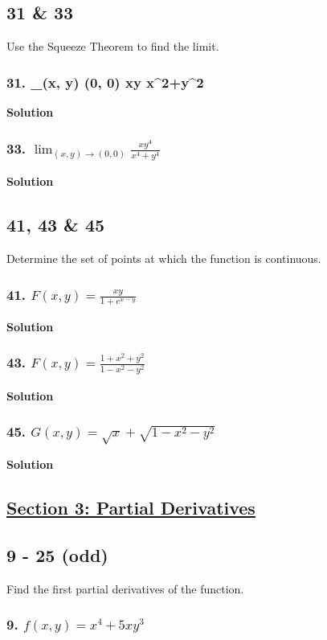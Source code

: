 \documentclass{article}
\newcommand{\limit}[4]{\lim_{(#1, #2) \to (#3, #4)}}
\begin{document}
\subsection*{31 \& 33}
Use the Squeeze Theorem to find the limit.
\subsubsection*{31. \limit x y 0 0 xy\sin \displaystyle{} {x^2+y^2}}
\centerline{\textbf{Solution}}
\subsubsection*{33. $\limit x y 0 0 \displaystyle\frac{xy^4}{x^4 + y^4}$}
\centerline{\textbf{Solution}}
\subsection*{41, 43 \& 45}
Determine the set of points at which the function is continuous.
\subsubsection*{41. $F(x,y) = \displaystyle\frac{xy}{1+e^{x-y}}$}
\centerline{\textbf{Solution}}
\subsubsection*{43. $F(x,y) = \displaystyle\frac{1+x^2+y^2}{1-x^2-y^2}$}
\centerline{\textbf{Solution}}
\subsubsection*{45. $G(x,y) = \sqrt x + \sqrt{1 - x^2 - y^2}$}
\centerline{\textbf{Solution}}

\newpage
\begin{center}
    \section*{\underline{Section 3: Partial Derivatives}}
\end{center}
\subsection*{9 - 25 (odd)}
Find the first partial derivatives of the function.
\subsubsection*{9. $f(x,y) = x^4 + 5xy^3$}
\end{document}
